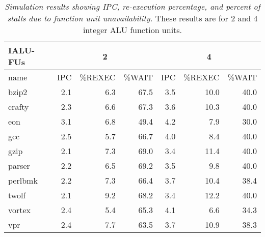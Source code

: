 \documentclass[10pt,dvips]{article}
\begin{document}
%
\begin{table}[p]
\begin{center}
\caption{{\em Simulation results showing IPC, re-execution percentage,
and percent of stalls due to function unit unavailability.}
These results are for 2 and 4 integer ALU function units.}
\label{tab:iwsize16a}
\vspace{+0.1in}
\begin{tabular}{|l||r|r|r||r|r|r|}
\hline 
{IALU-FUs}& 
\multicolumn{3}{c||}{2} &
\multicolumn{3}{c|}{4} \\
\hline
name &
IPC & \%REXEC & \%WAIT &
IPC & \%REXEC & \%WAIT \\

\hline
bzip2&
2.1&6.3&67.5&	3.5 & 10.0 & 40.0 \\

\hline
crafty&
2.3&6.6&67.3&	3.6 & 10.3 & 40.0 \\

\hline
eon&
3.1&6.8&49.4&	4.2 & 7.9 & 30.0 \\

\hline
gcc&
2.5&5.7&66.7&	4.0 & 8.4 & 40.0 \\

\hline
gzip&
2.1&7.3&69.0&	3.4 & 11.4 & 40.0 \\

\hline
parser&
2.2&6.5&69.2&	3.5 & 9.8 & 40.0 \\

\hline
perlbmk&
2.2&7.3&66.4&	3.7 & 10.4 & 38.4 \\

\hline
twolf&
2.1&9.2&68.2&	3.4 & 12.2 & 40.0 \\

\hline
vortex&
2.4&5.4&65.3&	4.1 & 6.6 & 34.3 \\

\hline
vpr&
2.4&7.7&63.5&	3.7 & 10.9 & 38.3 \\

\hline
\end{tabular}
\end{center}
\end{table}
%
\end{document}
